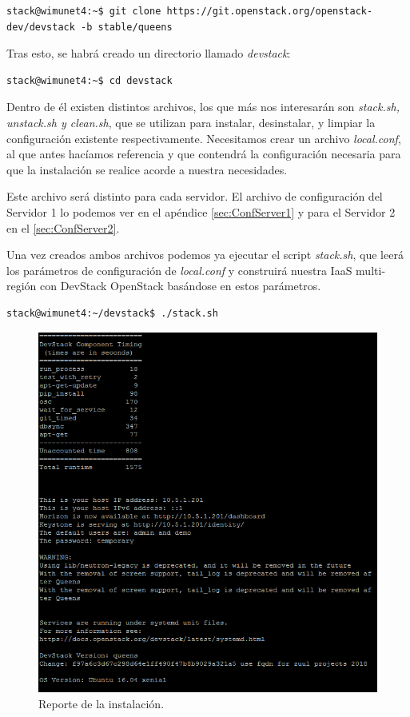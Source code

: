 \begin{lstlisting}[style=Consola]
stack@wimunet4:~$ git clone https://git.openstack.org/openstack-dev/devstack -b stable/queens
\end{lstlisting}

Tras esto, se habrá creado un directorio llamado \textit{devstack}:

\begin{lstlisting}[style=Consola]
stack@wimunet4:~$ cd devstack
\end{lstlisting}

Dentro de él existen distintos archivos, los que más nos interesarán son \textit{stack.sh, unstack.sh y clean.sh}, que se utilizan para instalar, desinstalar, y limpiar la configuración existente respectivamente. Necesitamos crear un archivo \textit{ local.conf}, al que antes hacíamos referencia y  que contendrá la configuración necesaria para que la instalación se realice acorde a nuestra necesidades. 

Este archivo será distinto para cada servidor. El archivo de configuración del Servidor 1 lo podemos ver en el apéndice \ref{sec:ConfServer1} y para el Servidor 2 en el \ref{sec:ConfServer2}.

Una vez creados ambos archivos podemos ya ejecutar el script \textit{stack.sh}, que leerá los parámetros de configuración de \textit{local.conf} y construirá nuestra IaaS multi-región con DevStack OpenStack basándose en estos parámetros.

\begin{lstlisting}
stack@wimunet4:~/devstack$ ./stack.sh
\end{lstlisting}

\begin{figure}
    \centering
    \includegraphics[width=1\textwidth]{imagenes/capitulo6/finInstalacionServer1.png}
    \caption{Reporte de la instalación.}
	\vspace{0.3cm}
    \label{fininstallserver1}
\end{figure}

